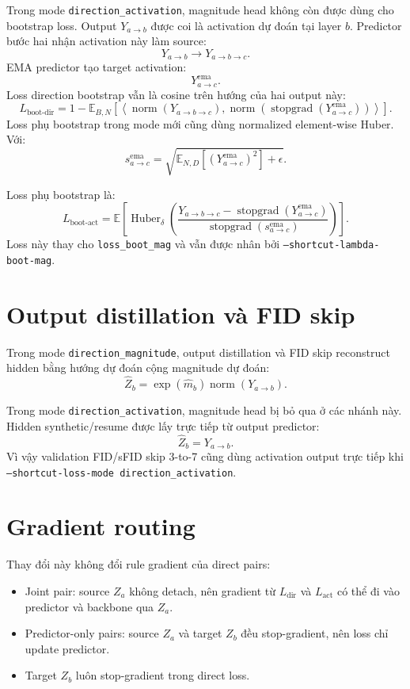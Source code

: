 \documentclass[11pt]{article}
\begin{document}
Trong mode \texttt{direction\_activation}, magnitude head không còn được dùng cho bootstrap loss.
Output \(Y_{a \rightarrow b}\) được coi là activation dự đoán tại layer \(b\).
Predictor bước hai nhận activation này làm source:
\[
Y_{a \rightarrow b} \rightarrow Y_{a \rightarrow b \rightarrow c}.
\]
EMA predictor tạo target activation:
\[
Y^{\text{ema}}_{a \rightarrow c}.
\]
Loss direction bootstrap vẫn là cosine trên hướng của hai output này:
\[
L_{\text{boot-dir}}
=
1 -
\mathbb{E}_{B,N}
\left[
\left\langle
\operatorname{norm}(Y_{a \rightarrow b \rightarrow c}),
\operatorname{norm}(\operatorname{stopgrad}(Y^{\text{ema}}_{a \rightarrow c}))
\right\rangle
\right].
\]
Loss phụ bootstrap trong mode mới cũng dùng normalized element-wise Huber. Với:
\[
s^{\text{ema}}_{a \rightarrow c}
=
\sqrt{
\mathbb{E}_{N,D}
\left[
\left(Y^{\text{ema}}_{a \rightarrow c}\right)^2
\right]
+ \epsilon
}.
\]

Loss phụ bootstrap là:
\[
L_{\text{boot-act}}
=
\mathbb{E}
\left[
\operatorname{Huber}_{\delta}
\left(
\frac{
Y_{a \rightarrow b \rightarrow c}
-
\operatorname{stopgrad}(Y^{\text{ema}}_{a \rightarrow c})
}{
\operatorname{stopgrad}(s^{\text{ema}}_{a \rightarrow c})
}
\right)
\right].
\]
Loss này thay cho \texttt{loss\_boot\_mag} và vẫn được nhân bởi \texttt{--shortcut-lambda-boot-mag}.

\section{Output distillation và FID skip}

Trong mode \texttt{direction\_magnitude}, output distillation và FID skip reconstruct hidden bằng hướng dự đoán cộng magnitude dự đoán:
\[
\hat{Z}_b = \exp(\hat{m}_b)\operatorname{norm}(Y_{a \rightarrow b}).
\]

Trong mode \texttt{direction\_activation}, magnitude head bị bỏ qua ở các nhánh này.
Hidden synthetic/resume được lấy trực tiếp từ output predictor:
\[
\hat{Z}_b = Y_{a \rightarrow b}.
\]
Vì vậy validation FID/sFID skip 3-to-7 cũng dùng activation output trực tiếp khi \texttt{--shortcut-loss-mode direction\_activation}.

\section{Gradient routing}

Thay đổi này không đổi rule gradient của direct pairs:

\begin{itemize}
  \item Joint pair: source \(Z_a\) không detach, nên gradient từ \(L_{\text{dir}}\) và \(L_{\text{act}}\) có thể đi vào predictor và backbone qua \(Z_a\).
  \item Predictor-only pairs: source \(Z_a\) và target \(Z_b\) đều stop-gradient, nên loss chỉ update predictor.
  \item Target \(Z_b\) luôn stop-gradient trong direct loss.
\end{itemize}
\end{document}
